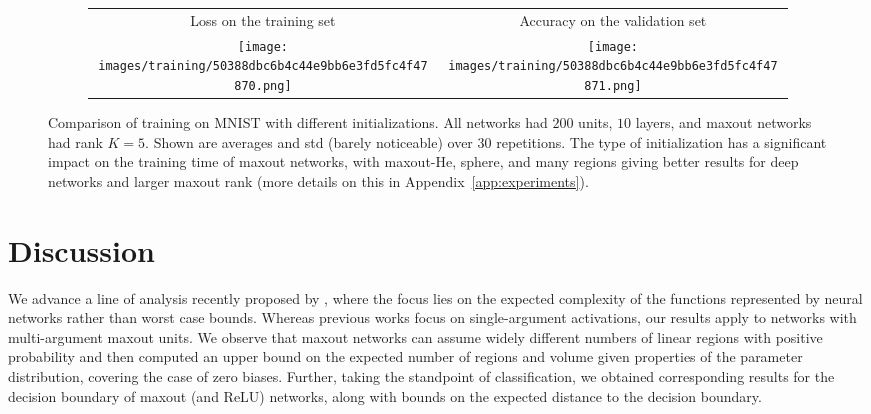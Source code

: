 \documentclass{article}
\theoremstyle{definition}
\begin{document}
\begin{figure}
    \begin{subfigure}{1.\textwidth}
        \centering
        \begin{tabular}{cc}
        {\small Loss on the training set} & {\small Accuracy on the validation set} \\
        \texttt{[image: images/training/50388dbc6b4c44e9bb6e3fd5fc4f47870.png]}&
        \texttt{[image: images/training/50388dbc6b4c44e9bb6e3fd5fc4f47871.png]}
        \end{tabular}
    \end{subfigure}
    \caption{
        Comparison of training on MNIST with different initializations. All networks had $200$ units, $10$ layers, and maxout networks had rank $K = 5$. Shown are averages and std (barely noticeable) over 30 repetitions. 
        The type of initialization has a significant impact on the training time of maxout networks, with maxout-He, sphere, and many regions giving better results for deep networks and larger maxout rank (more details on this in Appendix~\ref{app:experiments}). 
    }
    \label{fig:loss} 
\end{figure}

\newpage 
\section{Discussion}
\label{section:discussion}

We advance a line of analysis recently proposed by \citet{pmlr-v97-hanin19a,NIPS2019_8328}, where the focus lies on the expected complexity of the functions represented by neural networks rather than worst case bounds. Whereas previous works focus on single-argument activations, our results apply to networks with multi-argument maxout units. 
We observe that maxout networks can assume widely different numbers of linear regions with positive probability and then computed an upper bound on the expected number of regions and volume given properties of the parameter distribution, covering the case of zero biases. 
Further, taking the standpoint of classification, we obtained corresponding results for the decision boundary of maxout (and ReLU) networks, along with bounds on the expected distance to the decision boundary.
\end{document}

